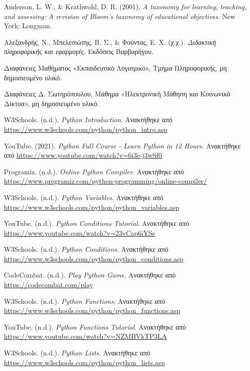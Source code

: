\documentclass[11pt]{report}
\begin{document}
\begin{thebibliography}{9}

Anderson, L. W., \& Krathwohl, D. R. (2001). \textit{A taxonomy for learning, teaching, and assessing: A revision of Bloom's taxonomy of educational objectives}. New York: Longman.

Αλεξανδρής, Ν., Μπελεσιώτης, Β. Σ., \& Φούντας, Ε. Χ. (χ.χ.). \textit{Διδακτική πληροφορικής και εφαρμογές}. Εκδόσεις Βαρβαρήγου.

Διαφάνειες Μαθήματος «Εκπαιδευτικό Λογισμικό», Τμήμα Πληροφορικής, μη δημοσιευμένο υλικό.

Διαφάνειες Δ. Σωτηρόπουλου, Μάθημα «Ηλεκτρονική Μάθηση και Κοινωνικά Δίκτυα», μη δημοσιευμένο υλικό.

W3Schools. (n.d.). \textit{Python Introduction}. Ανακτήθηκε από \url{https://www.w3schools.com/python/python_intro.asp}

YouTube. (2021). \textit{Python Full Course - Learn Python in 12 Hours}. Ανακτήθηκε από \url{https://www.youtube.com/watch?v=6i3e-j3wSf0}

Programiz. (n.d.). \textit{Online Python Compiler}. Ανακτήθηκε από \url{https://www.programiz.com/python-programming/online-compiler/}

W3Schools. (n.d.). \textit{Python Variables}. Ανακτήθηκε από \url{https://www.w3schools.com/python/python_variables.asp}

YouTube. (n.d.). \textit{Python Conditions Tutorial}. Ανακτήθηκε από \url{https://www.youtube.com/watch?v=23vCap6iYSs}

W3Schools. (n.d.). \textit{Python Conditions}. Ανακτήθηκε από \url{https://www.w3schools.com/python/python_conditions.asp}

CodeCombat. (n.d.). \textit{Play Python Game}. Ανακτήθηκε από \url{https://codecombat.com/play}

W3Schools. (n.d.). \textit{Python Functions}. Ανακτήθηκε από \url{https://www.w3schools.com/python/python_functions.asp}

YouTube. (n.d.). \textit{Python Functions Tutorial}. Ανακτήθηκε από \url{https://www.youtube.com/watch?v=NZMBVkTP3LA}

W3Schools. (n.d.). \textit{Python Lists}. Ανακτήθηκε από \url{https://www.w3schools.com/python/python_lists.asp}

\end{thebibliography}
\end{document}
